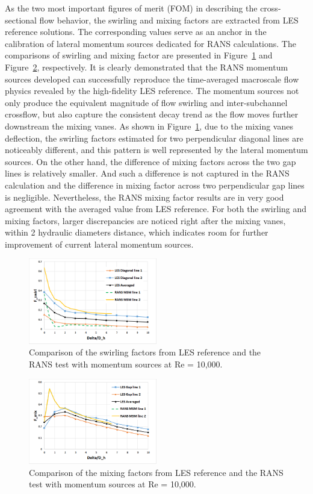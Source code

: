 As the two most important figures of merit (FOM) in describing the cross-sectional flow behavior, the swirling and mixing factors are extracted from LES reference solutions. 
The corresponding values serve as an anchor in the calibration of lateral momentum sources dedicated for RANS calculations. 
The comparisons of swirling and mixing factor are presented in Figure~\ref{fig:fswirl} and Figure~\ref{fig:fmix}, respectively. 
It is clearly demonstrated that the RANS momentum sources developed can successfully reproduce the time-averaged macroscale flow physics revealed by the high-fidelity LES reference. 
The momentum sources not only produce the equivalent magnitude of flow swirling and inter-subchannel crossflow, but also capture the consistent decay trend as the flow moves further downstream the mixing vanes. 
As shown in Figure~\ref{fig:fswirl}, due to the mixing vanes deflection, the swirling factors estimated for two perpendicular diagonal lines are noticeably different, and this pattern is well represented by the lateral momentum sources. 
On the other hand, the difference of mixing factors across the two gap lines is relatively smaller. And such a difference is not captured in the RANS calculation and the difference in mixing factor across two perpendicular gap lines is negligible. 
Nevertheless, the RANS mixing factor results are in very good agreement with the averaged value from LES reference. For both the swirling and mixing factors, larger discrepancies are noticed right after the mixing vanes, within 2 hydraulic diameters distance, which indicates room for further improvement of current lateral momentum sources. 

\begin{figure}[!ht]
\centering
\includegraphics[width=0.5\textwidth]{./figures/Results_swirling_factor.png}
\caption{Comparison of the swirling factors from LES reference and the RANS test with momentum sources at Re = 10,000. }
\label{fig:fswirl}
\end{figure}

\begin{figure}[!ht]
\centering
\includegraphics[width=0.5\textwidth]{./figures/Results_mixing_factor.png}
\caption{Comparison of the mixing factors from LES reference and the RANS test with momentum sources at Re = 10,000. }
\label{fig:fmix}
\end{figure}

